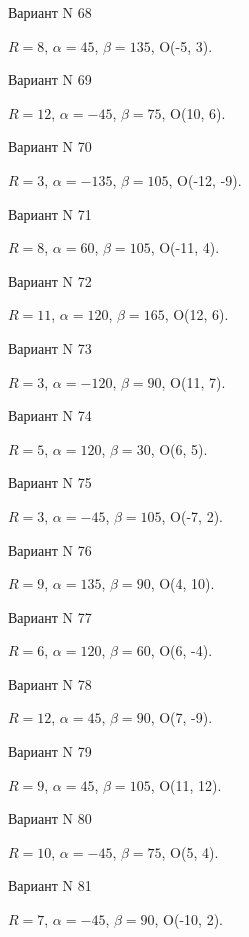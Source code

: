 \documentclass[11pt]{report}
\begin{document}
Вариант N 68

$R = 8$, $\alpha = 45$, $\beta = 135$, O(-5, 3).



Вариант N 69

$R = 12$, $\alpha = -45$, $\beta = 75$, O(10, 6).



Вариант N 70

$R = 3$, $\alpha = -135$, $\beta = 105$, O(-12, -9).



Вариант N 71

$R = 8$, $\alpha = 60$, $\beta = 105$, O(-11, 4).



Вариант N 72

$R = 11$, $\alpha = 120$, $\beta = 165$, O(12, 6).



Вариант N 73

$R = 3$, $\alpha = -120$, $\beta = 90$, O(11, 7).



Вариант N 74

$R = 5$, $\alpha = 120$, $\beta = 30$, O(6, 5).



Вариант N 75

$R = 3$, $\alpha = -45$, $\beta = 105$, O(-7, 2).



Вариант N 76

$R = 9$, $\alpha = 135$, $\beta = 90$, O(4, 10).



Вариант N 77

$R = 6$, $\alpha = 120$, $\beta = 60$, O(6, -4).



Вариант N 78

$R = 12$, $\alpha = 45$, $\beta = 90$, O(7, -9).



Вариант N 79

$R = 9$, $\alpha = 45$, $\beta = 105$, O(11, 12).



Вариант N 80

$R = 10$, $\alpha = -45$, $\beta = 75$, O(5, 4).



Вариант N 81

$R = 7$, $\alpha = -45$, $\beta = 90$, O(-10, 2).
\end{document}
